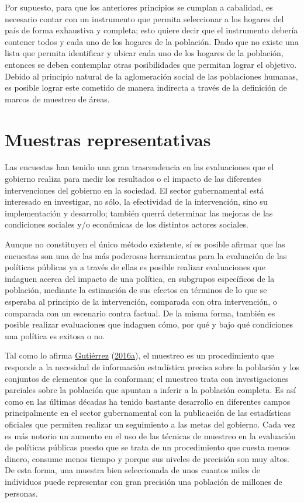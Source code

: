 \documentclass[
  12pt,
  spanish,
]{book}
\begin{document}
Por supuesto, para que los anteriores principios se cumplan a cabalidad, es necesario contar con un instrumento que permita seleccionar a los hogares del país de forma exhaustiva y completa; esto quiere decir que el instrumento debería contener todos y cada uno de los hogares de la población. Dado que no existe una lista que permita identificar y ubicar cada uno de los hogares de la población, entonces se deben contemplar otras posibilidades que permitan lograr el objetivo. Debido al principio natural de la aglomeración social de las poblaciones humanas, es posible lograr este cometido de manera indirecta a través de la definición de marcos de muestreo de áreas.

\hypertarget{muestras-representativas}{%
\section{Muestras representativas}\label{muestras-representativas}}

Las encuestas han tenido una gran trascendencia en las evaluaciones que el gobierno realiza para medir los resultados o el impacto de las diferentes intervenciones del gobierno en la sociedad. El sector gubernamental está interesado en investigar, no sólo, la efectividad de la intervención, sino su implementación y desarrollo; también querrá determinar las mejoras de las condiciones sociales y/o económicas de los distintos actores sociales.

Aunque no constituyen el único método existente, sí es posible afirmar que las encuestas son una de las más poderosas herramientas para la evaluación de las políticas públicas ya a través de ellas es posible realizar evaluaciones que indaguen acerca del impacto de una política, en subgrupos específicos de la población, mediante la estimación de sus efectos en términos de lo que se esperaba al principio de la intervención, comparada con otra intervención, o comparada con un escenario contra factual. De la misma forma, también es posible realizar evaluaciones que indaguen cómo, por qué y bajo qué condiciones una política es exitosa o no.

Tal como lo afirma \protect\hyperlink{ref-Gutierrez_2016}{Gutiérrez} (\protect\hyperlink{ref-Gutierrez_2016}{2016a}), el muestreo es un procedimiento que responde a la necesidad de información estadística precisa sobre la población y los conjuntos de elementos que la conforman; el muestreo trata con investigaciones parciales sobre la población que apuntan a inferir a la población completa. Es así como en las últimas décadas ha tenido bastante desarrollo en diferentes campos principalmente en el sector gubernamental con la publicación de las estadísticas oficiales que permiten realizar un seguimiento a las metas del gobierno. Cada vez es más notorio un aumento en el uso de las técnicas de muestreo en la evaluación de políticas públicas puesto que se trata de un procedimiento que cuesta menos dinero, consume menos tiempo y porque sus niveles de precisión son muy altos. De esta forma, una muestra bien seleccionada de unos cuantos miles de individuos puede representar con gran precisión una población de millones de personas.
\end{document}
